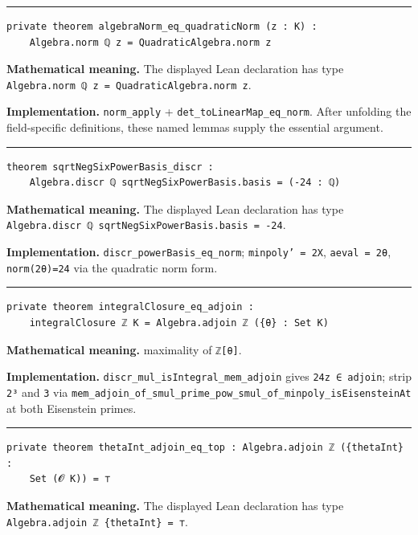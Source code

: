 \documentclass[UTF8,a4paper,11pt,fontset=fandol]{ctexart}
\theoremstyle{definition}
\newcommand{\statementsep}{\par\medskip\hrule\medskip}
\begin{document}
\statementsep
\begin{verbatim}
private theorem algebraNorm_eq_quadraticNorm (z : K) :
    Algebra.norm ℚ z = QuadraticAlgebra.norm z
\end{verbatim}
\noindent\textbf{Mathematical meaning.} The displayed Lean declaration has type \texttt{Algebra.\allowbreak{}norm ℚ z = QuadraticAlgebra.\allowbreak{}norm z}.\par
\noindent\textbf{Implementation.} \texttt{norm\_\allowbreak{}apply} + \texttt{det\_\allowbreak{}toLinearMap\_\allowbreak{}eq\_\allowbreak{}norm}. After unfolding the field-specific definitions, these named lemmas supply the essential argument.\par
\statementsep
\begin{verbatim}
theorem sqrtNegSixPowerBasis_discr :
    Algebra.discr ℚ sqrtNegSixPowerBasis.basis = (-24 : ℚ)
\end{verbatim}
\noindent\textbf{Mathematical meaning.} The displayed Lean declaration has type \texttt{Algebra.\allowbreak{}discr ℚ sqrtNegSixPowerBasis.\allowbreak{}basis = -24}.\par
\noindent\textbf{Implementation.} \texttt{discr\_\allowbreak{}powerBasis\_\allowbreak{}eq\_\allowbreak{}norm}; \texttt{minpoly' = 2X}, \texttt{aeval = 2θ}, \texttt{norm(2θ)=24} via the quadratic norm form.\par
\statementsep
\begin{verbatim}
private theorem integralClosure_eq_adjoin :
    integralClosure ℤ K = Algebra.adjoin ℤ ({θ} : Set K)
\end{verbatim}
\noindent\textbf{Mathematical meaning.} maximality of \texttt{ℤ[θ]}.\par
\noindent\textbf{Implementation.} \texttt{discr\_\allowbreak{}mul\_\allowbreak{}isIntegral\_\allowbreak{}mem\_\allowbreak{}adjoin} gives \texttt{24z ∈ adjoin}; strip \texttt{2³} and \texttt{3} via \texttt{mem\_\allowbreak{}adjoin\_\allowbreak{}of\_\allowbreak{}smul\_\allowbreak{}prime\_\allowbreak{}pow\_\allowbreak{}smul\_\allowbreak{}of\_\allowbreak{}minpoly\_\allowbreak{}isEisensteinAt} at both Eisenstein primes.\par
\statementsep
\begin{verbatim}
private theorem thetaInt_adjoin_eq_top : Algebra.adjoin ℤ ({thetaInt} :
    Set (𝓞 K)) = ⊤
\end{verbatim}
\noindent\textbf{Mathematical meaning.} The displayed Lean declaration has type \texttt{Algebra.\allowbreak{}adjoin ℤ \{thetaInt\} = ⊤}.\par
\end{document}
